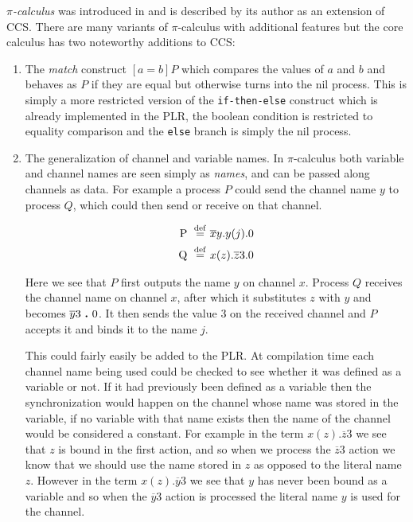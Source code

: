 	\textit{$\pi$-calculus} was introduced in \cite{Milner89acalculus} and is 
	described by its author as an extension of CCS. There are many variants of 
	$\pi$-calculus with additional features but the core calculus has two 
	noteworthy additions to CCS:
	
	\begin{enumerate}
		\item The \textit{match} construct $[a = b] P$ which compares the values 
		of $a$ and $b$ and behaves as $P$ if they are equal but otherwise turns 
		into the nil process. This is simply a more restricted version of the 
		\texttt{if-then-else} construct which is already implemented in the PLR, 
		the boolean condition is restricted to equality comparison and the 
		\texttt{else} branch is simply the nil process. 
		
		\item The generalization of channel and variable names. In $\pi$-calculus 
		both variable and channel names are seen simply as \textit{names}, and can 
		be passed along channels as data. For example a process $P$ could send the 
		channel name $y$ to process $Q$, which could then send or receive on that 
		channel.
		
	  \begin{align*}
			\mathrm{P} \ \stackrel{\mathrm{def}}{=}\  & \overline{x}y . y(j) . 0\\
			\mathrm{Q} \ \stackrel{\mathrm{def}}{=}\  & x(z) . \overline{z}3 . 0\\
		\end{align*} 
		
		Here we see that $P$ first outputs the name $y$ on channel $x$. Process 
		$Q$ receives the channel name on channel $x$, after which it substitutes
		$z$ with $y$ and becomes $\overline{y}3 \ \textbf{.}\  0$. It then sends the value
		3 on the received channel and $P$ accepts it and binds it to the name $j$.
		
		This could fairly easily be added to the PLR. At compilation time each 
		channel name being used could be checked to see whether it was defined as 
		a variable or not. If it had previously been defined as a variable then 
		the synchronization would happen on the channel whose name was stored in 
		the variable, if no variable with that name exists then the name of the 
		channel would be considered a constant. For example in the term $x(z) . 
		\overline{z}3$ we see that $z$ is bound in the first action, and so when 
		we process the $\overline{z}3$ action we know that we should use the name
		stored in $z$ as opposed to the literal name $z$. However in the term 
		$x(z) . \overline{y}3$ we see that $y$ has never been bound as a variable 
		and so when the $\overline{y}3$ action is processed the literal name $y$ 
		is used for the channel.
		
	\end{enumerate}
	
